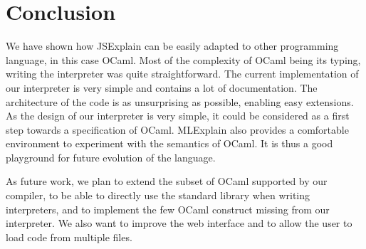 \documentclass[twocolumn,a4paper]{article}
\begin{document}
\section{Conclusion}
We have shown how JSExplain can be easily adapted to other programming language,
in this case OCaml. Most of the complexity of OCaml being its typing, writing
the interpreter was quite straightforward. The current implementation of our
interpreter is very simple and contains a lot of documentation. The architecture
of the code is as unsurprising as possible, enabling easy extensions. As the
design of our interpreter is very simple, it could be considered as a first step
towards a specification of OCaml. MLExplain also provides a comfortable
environment to experiment with the semantics of OCaml. It is thus a good
playground for future evolution of the language.

As future work, we plan to extend the subset of OCaml supported by our compiler,
to be able to directly use the standard library when writing interpreters, and
to implement the few OCaml construct missing from our interpreter. We also want
to improve the web interface and to allow the user to load code from multiple files.



\end{document}
